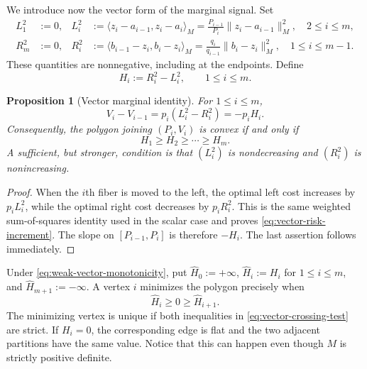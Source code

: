 \documentclass[a4paper]{amsart}
\numberwithin{equation}{section}
\newtheorem{proposition}[theorem]{Proposition}
\theoremstyle{remark}
\newcommand{\1}{\mathbf 1}
\begin{document}
We introduce now the vector form of the marginal signal.
Set
\begin{align}
  L_1^2&:=0,
  &L_i^2&:=\langle z_i-a_{i-1},z_i-a_i\rangle_M
       =\frac{P_{i-1}}{P_i}\|z_i-a_{i-1}\|_M^2,\quad 2\leq i\leq m,
       \label{eq:left-vector-radius}\\
  R_m^2&:=0,
  &R_i^2&:=\langle b_{i-1}-z_i,b_i-z_i\rangle_M
       =\frac{q_i}{q_{i-1}}\|b_i-z_i\|_M^2,\quad 1\leq i\leq m-1.
       \label{eq:right-vector-radius}
\end{align}
These quantities are nonnegative, including at the endpoints.  Define
\begin{equation}\label{eq:vector-signal}
  H_i:=R_i^2-L_i^2,
  \qquad 1\leq i\leq m.
\end{equation}

\begin{proposition}[Vector marginal identity]
\label{prop:vector-marginal-identity}
For $1\leq i\leq m$,
\begin{equation}\label{eq:vector-risk-increment}
  V_i-V_{i-1}=p_i(L_i^2-R_i^2)=-p_iH_i.
\end{equation}
Consequently, the polygon joining $(P_i,V_i)$ is convex if and only if
\begin{equation}\label{eq:weak-vector-monotonicity}
  H_1\geq H_2\geq\cdots\geq H_m.
\end{equation}
A sufficient, but stronger, condition is that $(L_i^2)$ is nondecreasing
and $(R_i^2)$ is nonincreasing.
\end{proposition}

\begin{proof}
When the $i$th fiber is moved to the left, the optimal left cost increases by
$p_iL_i^2$, while the optimal right cost decreases by $p_iR_i^2$.  This is the
same weighted sum-of-squares identity used in the scalar case and proves
\eqref{eq:vector-risk-increment}.  The slope on $[P_{i-1},P_i]$ is therefore
$-H_i$.  The last assertion follows immediately.
\end{proof}

Under \eqref{eq:weak-vector-monotonicity}, put
$\widehat H_0:=+\infty$, $\widehat H_i:=H_i$ for $1\leq i\leq m$, and
$\widehat H_{m+1}:=-\infty$.  A vertex $i$ minimizes the polygon precisely
when
\begin{equation}\label{eq:vector-crossing-test}
  \widehat H_i\geq0\geq \widehat H_{i+1}.
\end{equation}
The minimizing vertex is unique if both inequalities in
\eqref{eq:vector-crossing-test} are strict.
If $H_i=0$, the corresponding edge is flat and the two adjacent partitions
have the same value.  Notice that this can happen even though $M$ is strictly
positive definite.
\end{document}
